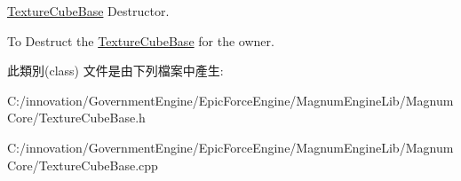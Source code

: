 \hyperlink{class_i_dream_sky_1_1_texture_cube_base}{Texture\+Cube\+Base} Destructor. 

To Destruct the \hyperlink{class_i_dream_sky_1_1_texture_cube_base}{Texture\+Cube\+Base} for the owner. 

此類別(class) 文件是由下列檔案中產生\+:\begin{DoxyCompactItemize}
\item 
C\+:/innovation/\+Government\+Engine/\+Epic\+Force\+Engine/\+Magnum\+Engine\+Lib/\+Magnum\+Core/Texture\+Cube\+Base.\+h\item 
C\+:/innovation/\+Government\+Engine/\+Epic\+Force\+Engine/\+Magnum\+Engine\+Lib/\+Magnum\+Core/Texture\+Cube\+Base.\+cpp\end{DoxyCompactItemize}
